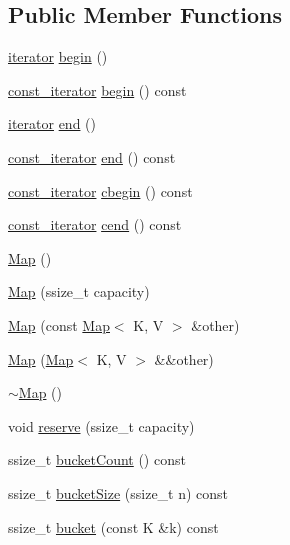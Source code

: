 \subsection*{Public Member Functions}
\begin{DoxyCompactItemize}
\item 
\hyperlink{classMap_ad1f372a2028b9f46497e873b0e984e84}{iterator} \hyperlink{classMap_a34cb1bcee32679df8fd3b43f5260e4e9}{begin} ()
\item 
\hyperlink{classMap_add90fe1e25806ba6f6278b264e78ee9a}{const\+\_\+iterator} \hyperlink{classMap_ae14bb8eaf9dffd6b75b8cc0df481836a}{begin} () const
\item 
\hyperlink{classMap_ad1f372a2028b9f46497e873b0e984e84}{iterator} \hyperlink{classMap_af7192ef1dd6fb558c06442c00a4c516e}{end} ()
\item 
\hyperlink{classMap_add90fe1e25806ba6f6278b264e78ee9a}{const\+\_\+iterator} \hyperlink{classMap_a21f3b20a8a1492065dd775714c5ab8ef}{end} () const
\item 
\hyperlink{classMap_add90fe1e25806ba6f6278b264e78ee9a}{const\+\_\+iterator} \hyperlink{classMap_a489400386fcc9a5e8acd21fbf2c528a1}{cbegin} () const
\item 
\hyperlink{classMap_add90fe1e25806ba6f6278b264e78ee9a}{const\+\_\+iterator} \hyperlink{classMap_a40031f69b69e9bf0fe13319463f4251d}{cend} () const
\item 
\hyperlink{classMap_a06f9fc5d4c9a639994f8d8eb280ae7ed}{Map} ()
\item 
\hyperlink{classMap_a6a09ecf2e2b5a016be8f3034ef67c051}{Map} (ssize\+\_\+t capacity)
\item 
\hyperlink{classMap_afd84c24b9220a40dda8ef82aaf533710}{Map} (const \hyperlink{classMap}{Map}$<$ K, V $>$ \&other)
\item 
\hyperlink{classMap_adf81c5ca8314af5a2feeffd6a727ac65}{Map} (\hyperlink{classMap}{Map}$<$ K, V $>$ \&\&other)
\item 
\hyperlink{classMap_a6d8939f2cc39bf1f49ac76e32822e96c}{$\sim$\+Map} ()
\item 
void \hyperlink{classMap_a13b7b471133038741b63494407300df4}{reserve} (ssize\+\_\+t capacity)
\item 
ssize\+\_\+t \hyperlink{classMap_a7135028b2bcb299bd6dd71396cd5fb40}{bucket\+Count} () const
\item 
ssize\+\_\+t \hyperlink{classMap_ad78a1db4b42ed7c3d0f091cd3482b6de}{bucket\+Size} (ssize\+\_\+t n) const
\item 
ssize\+\_\+t \hyperlink{classMap_afb67ba82e34168ef9cc2c093e0782aee}{bucket} (const K \&k) const

\end{DoxyCompactItemize}
